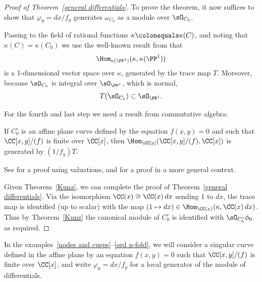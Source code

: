 \begin{proof}[Proof of Theorem~\ref{general differentials}]
 To prove the theorem, it now suffices to
show that
$\varphi_{0}=dx/f_{y}$ generates $\omega_{C_{0}}$ as a module over $\sO_{C_{0}}$.

Passing to the field of rational functions $\kappa \colonequals
\kappa(C)$, and noting that
$\kappa(C) = \kappa(C_{0}) $ we use the well-known result from 
%
that
$$
\Hom_{\kappa(\PP^{1})}(\kappa, \kappa(\PP^{1}))
$$
is a 1-dimensional vector space over $\kappa$, generated by the trace map
%
$T$. Moreover,
because $\sO_{C_{0}}$ is integral over $\sO_{\PP^{1}}$, which is normal,
$$
T(\sO_{C_{0}})\subset \sO_{\PP^{1}}.
$$

For the fourth and last step we need a
result from commutative
algebra:

\begin{theorem}\label{Kunz}
If $C_{0}^{\circ}$ is an affine plane curve defined by the
equation $f(x,y)=0$ and such that $\CC[x,y]/(f)$ is finite over $\CC[x]$,
then $\Hom_{\CC[x]}(\CC[x,y]/(f), \CC[x])$ is generated by $(1/f_{y})T$.
\unif
\end{theorem}

See \cite[Theorem 15.1]{Kunz} for a proof using valuations, and
\cite[Theorem A.1]{MR4026452} for a proof in
a more general context.

Given Theorem~\ref{Kunz}, we can complete the proof of
Theorem~\ref{general differentials}. Via the isomorphism $\CC(x) \cong
\CC(x)\,dx$ sending 1 to $dx$, the trace map is identified (up to scalar)
with the map $(1\mapsto dx) \in \Hom_{\CC(x)}(\kappa, \CC(x)\,dx)$. Thus
by Theorem~\ref{Kunz}
the canonical module of $C_{0}^{\circ}$ is identified with
$\sO_{C_{0}^\circ} \phi_{0}$ as
required.
\end{proof}

In the  examples~\ref{nodes and cusps}--\ref{ord n-fold}, we will consider a singular 
 curve defined in the affine plane by an equation $f(x,y) = 0$
 such that $\CC[x,y]/(f)$ is finite over $\CC[x]$, and write $\varphi_{0} = dx/f_{y}$
 for a local generator of the module of differentials.
 
